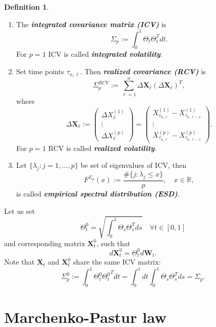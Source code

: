 \documentclass[a4paper,11pt]{article}
\theoremstyle{plain}
\theoremstyle{definition}
\newtheorem{defn}[thm]{Definition}
\newcommand{\MR}{\mathbb{R}}
\newcommand{\define}[1]{\textit{\textbf{#1}}}
\begin{document}
	\begin{defn} \
		\begin{enumerate}
			\item The \define{integrated covariance matrix (ICV)} is
			\[\Sigma_p := \int_0^1\Theta_t \Theta_t^T dt.\]
			For $p=1$ ICV is called \define{integrated volatility}.
			\item Set time points $\tau_{n, \ell}$. Then \define{realized covariance (RCV)} is
			\begin{equation} \label{RCV}
				\Sigma_p^{RCV} := \sum_{\ell=1}^{n}\Delta \mathbf{X}_\ell(\Delta \mathbf{X}_\ell)^T,
			\end{equation}
			where 
			\[ \Delta \mathbf{X}_\ell :=
			\begin{pmatrix}
			\Delta X_\ell^{(1)} \\
			\vdots \\
			\Delta X_\ell^{(p)}
			\end{pmatrix}
			=
			\begin{pmatrix}
			X_{\tau_{n,\ell}}^{(1)} - X_{\tau_{n, \ell-1}}^{(1)} \\
			\vdots \\
			X_{\tau_{n,\ell}}^{(p)} - X_{\tau_{n, \ell-1}}^{(p)}
			\end{pmatrix}. \]
			For $p=1$ RCV is called \define{realized volatility}.
			\item Let $\{\lambda_j:j=1,\dots, p\}$ be set of eigenvalues of ICV, then
			\[F^{\Sigma_p}(x) := \frac{\#\{j:\lambda_j \leq x\}}{p}, \quad x \in \MR, \]
			is called \define{empirical spectral distribution (ESD)}.
		\end{enumerate}
	\end{defn}
	
	
	Let us set
	\[ \Theta_t^0 = \sqrt{\int_0^1\Theta_s \Theta_s^T ds} \quad \forall t \in [0, 1] \]
	and corresponding matrix $\mathbf{X}_t^0$, such that
	\[ d\mathbf{X}_t^0 = \Theta_t^0d\mathbf{W}_t. \]
	Note that $\mathbf{X}_t$ and $\mathbf{X}_t^0$ share the same ICV matrix:
	\[ \Sigma_p^0 :=  \int_0^1\Theta_t^0 {\Theta_t^0}^T dt = \int_0^1 dt \int_0^1\Theta_s \Theta_s^T ds = \Sigma_p.  \]
	
	\section{Marchenko-Pastur law}
	
\end{document}
